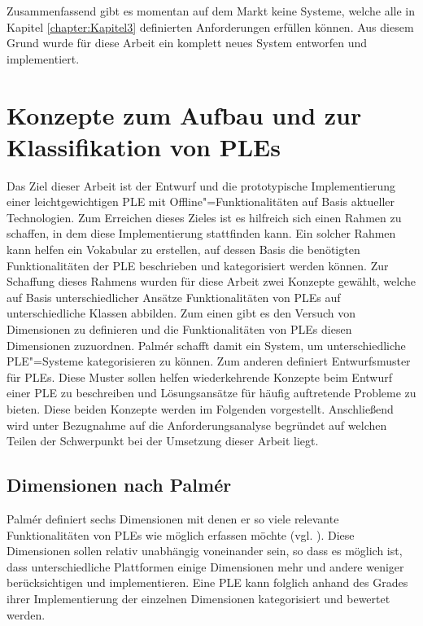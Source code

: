 Zusammenfassend gibt es momentan auf dem Markt keine Systeme, welche alle in Kapitel \ref{chapter:Kapitel3} definierten Anforderungen erfüllen können. Aus diesem Grund wurde für diese Arbeit ein komplett neues System entworfen und implementiert.

\section{Konzepte zum Aufbau und zur Klassifikation von \acp{PLE}}
Das Ziel dieser Arbeit ist der Entwurf und die prototypische Implementierung einer leichtgewichtigen \ac{PLE} mit Offline"=Funktionalitäten auf Basis aktueller Technologien. Zum Erreichen dieses Zieles ist es hilfreich sich einen Rahmen zu schaffen, in dem diese Implementierung stattfinden kann. Ein solcher Rahmen kann helfen ein Vokabular zu erstellen, auf dessen Basis die benötigten Funktionalitäten der \ac{PLE} beschrieben und kategorisiert werden können. Zur Schaffung dieses Rahmens wurden für diese Arbeit zwei Konzepte gewählt, welche auf Basis unterschiedlicher Ansätze Funktionalitäten von \acp{PLE} auf unterschiedliche Klassen abbilden. Zum einen gibt es den Versuch von \cite{Palmer2009} Dimensionen zu definieren und die Funktionalitäten von \acp{PLE} diesen Dimensionen zuzuordnen. Palmér schafft damit ein System, um unterschiedliche \ac{PLE}"=Systeme kategorisieren zu können. Zum anderen definiert \cite{Wilson2008} Entwurfsmuster für \acp{PLE}. Diese Muster sollen helfen wiederkehrende Konzepte beim Entwurf einer \ac{PLE} zu beschreiben und Lösungsansätze für häufig auftretende Probleme zu bieten. Diese beiden Konzepte werden im Folgenden vorgestellt. Anschließend wird unter Bezugnahme auf die Anforderungsanalyse begründet auf welchen Teilen der Schwerpunkt bei der Umsetzung dieser Arbeit liegt.

\subsection{Dimensionen nach Palmér}\label{section:dimensions_palmer} 
Palmér definiert sechs Dimensionen mit denen er so viele relevante Funktionalitäten von \acp{PLE} wie möglich erfassen möchte (vgl. \cite{Palmer2009}). Diese Dimensionen sollen relativ unabhängig voneinander sein, so dass es möglich ist, dass unterschiedliche Plattformen einige Dimensionen mehr und andere weniger berücksichtigen und implementieren. Eine \ac{PLE} kann folglich anhand des Grades ihrer Implementierung der einzelnen Dimensionen kategorisiert und bewertet werden.

